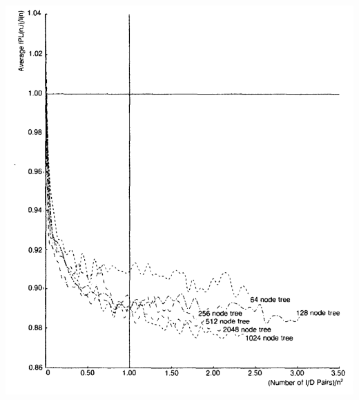 \documentclass{beamer}
\begin{document}
\begin{frame}[plain]
    \begin{center}
        \includegraphics[width=\paperwidth,height=\paperheight,keepaspectratio]{plotEppingerSym.png}
    \end{center}
\end{frame}

\printbibliography
\frame{\titlepage}
\end{document}
